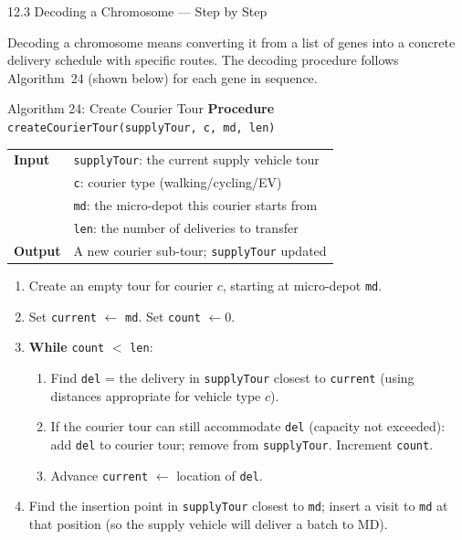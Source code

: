 \documentclass[aspectratio=169,10pt]{beamer}
\begin{document}
\begin{frame}[allowframebreaks]{12.3 Decoding a Chromosome --- Step by Step}

Decoding a chromosome means converting it from a list of genes
into a concrete delivery schedule with specific routes.
The decoding procedure follows Algorithm~24 (shown below)
for each gene in sequence.

\medskip

\begin{block}{Algorithm 24: Create Courier Tour}
  \textbf{Procedure} \texttt{createCourierTour(supplyTour, c, md, len)}

  \smallskip
  \begin{tabular}{ll}
    \textbf{Input} & \texttt{supplyTour}: the current supply vehicle tour \\
                   & \texttt{c}: courier type (walking/cycling/EV) \\
                   & \texttt{md}: the micro-depot this courier starts from \\
                   & \texttt{len}: the number of deliveries to transfer \\
    \textbf{Output} & A new courier sub-tour; \texttt{supplyTour} updated \\
  \end{tabular}

  \smallskip
  \begin{enumerate}
    \item Create an empty tour for courier $c$, starting at micro-depot \texttt{md}.
    \item Set \texttt{current} $\leftarrow$ \texttt{md}.
          Set \texttt{count} $\leftarrow 0$.
    \item \textbf{While} \texttt{count} $<$ \texttt{len}:
      \begin{enumerate}
        \item Find \texttt{del} = the delivery in \texttt{supplyTour} closest
              to \texttt{current} (using distances appropriate for vehicle type $c$).
        \item If the courier tour can still accommodate \texttt{del}
              (capacity not exceeded):
              add \texttt{del} to courier tour; remove from \texttt{supplyTour}.
              Increment \texttt{count}.
        \item Advance \texttt{current} $\leftarrow$ location of \texttt{del}.
      \end{enumerate}
    \item Find the insertion point in \texttt{supplyTour} closest to \texttt{md};
          insert a visit to \texttt{md} at that position
          (so the supply vehicle will deliver a batch to MD).
  \end{enumerate}
\end{block}


\end{frame}
\end{document}
